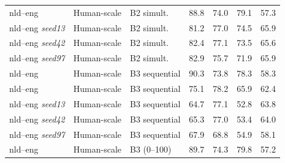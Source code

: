 \begin{table}[t]
\begin{tabular}{lll cc cc}
nld--eng & Human-scale & B2 simult. & \cellcolor[rgb]{0.785,1.000,0.785} 88.8 & \cellcolor[rgb]{0.869,1.000,0.869} 74.0 & \cellcolor[rgb]{0.793,1.000,0.793} 79.1 & \cellcolor[rgb]{0.940,1.000,0.940} 57.3 \\
nld--eng {\scriptsize\textit{seed13}} & Human-scale & B2 simult. & \cellcolor[rgb]{0.827,1.000,0.827} 81.2 & \cellcolor[rgb]{0.853,1.000,0.853} 77.0 & \cellcolor[rgb]{0.826,1.000,0.826} 74.5 & \cellcolor[rgb]{0.869,1.000,0.869} 65.9 \\
nld--eng {\scriptsize\textit{seed42}} & Human-scale & B2 simult. & \cellcolor[rgb]{0.821,1.000,0.821} 82.4 & \cellcolor[rgb]{0.852,1.000,0.852} 77.1 & \cellcolor[rgb]{0.833,1.000,0.833} 73.5 & \cellcolor[rgb]{0.872,1.000,0.872} 65.6 \\
nld--eng {\scriptsize\textit{seed97}} & Human-scale & B2 simult. & \cellcolor[rgb]{0.818,1.000,0.818} 82.9 & \cellcolor[rgb]{0.860,1.000,0.860} 75.7 & \cellcolor[rgb]{0.844,1.000,0.844} 71.9 & \cellcolor[rgb]{0.869,1.000,0.869} 65.9 \\
nld--eng & Human-scale & B3 sequential & \cellcolor[rgb]{0.777,1.000,0.777} 90.3 & \cellcolor[rgb]{0.870,1.000,0.870} 73.8 & \cellcolor[rgb]{0.799,1.000,0.799} 78.3 & \cellcolor[rgb]{0.932,1.000,0.932} 58.3 \\
nld--eng  & Human-scale & B3 sequential & \cellcolor[rgb]{0.861,1.000,0.861} 75.1 & \cellcolor[rgb]{0.846,1.000,0.846} 78.2 & \cellcolor[rgb]{0.887,1.000,0.887} 65.9 & \cellcolor[rgb]{0.898,1.000,0.898} 62.4 \\
nld--eng {\scriptsize\textit{seed13}} & Human-scale & B3 sequential & \cellcolor[rgb]{0.919,1.000,0.919} 64.7 & \cellcolor[rgb]{0.852,1.000,0.852} 77.1 & \cellcolor[rgb]{0.980,1.000,0.980} 52.8 & \cellcolor[rgb]{0.886,1.000,0.886} 63.8 \\
nld--eng {\scriptsize\textit{seed42}} & Human-scale & B3 sequential & \cellcolor[rgb]{0.915,1.000,0.915} 65.3 & \cellcolor[rgb]{0.853,1.000,0.853} 77.0 & \cellcolor[rgb]{0.976,1.000,0.976} 53.4 & \cellcolor[rgb]{0.885,1.000,0.885} 64.0 \\
nld--eng {\scriptsize\textit{seed97}} & Human-scale & B3 sequential & \cellcolor[rgb]{0.901,1.000,0.901} 67.9 & \cellcolor[rgb]{0.897,1.000,0.897} 68.8 & \cellcolor[rgb]{0.965,1.000,0.965} 54.9 & \cellcolor[rgb]{0.933,1.000,0.933} 58.1 \\
nld--eng & Human-scale & B3 (0--100) & \cellcolor[rgb]{0.780,1.000,0.780} 89.7 & \cellcolor[rgb]{0.867,1.000,0.867} 74.3 & \cellcolor[rgb]{0.788,1.000,0.788} 79.8 & \cellcolor[rgb]{0.941,1.000,0.941} 57.2 \\

\end{tabular}
\end{table}
